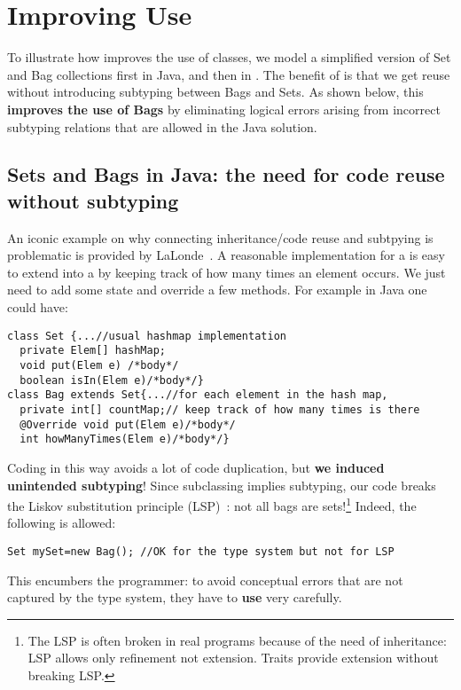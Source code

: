 \saveSpace
\section{Improving Use}
\saveSpace
To illustrate how 
\name improves the use of classes, we model a simplified version of
Set and Bag collections first in Java, and then in \name.
The benefit of \name is that we get reuse 
without introducing subtyping between Bags and Sets.
As shown below, this \textbf{improves the 
use of Bags} by eliminating logical errors arising from incorrect
subtyping relations that are allowed in the Java solution. 
\saveSpace
\subsection{Sets and Bags in Java: the need for code reuse without 
subtyping}
\saveSpace
An iconic example on why connecting inheritance/code reuse and
subtpying is problematic is provided by
LaLonde~\cite{LaLonde:1991:SSS:110673.110679}.  A reasonable
implementation for a \Q@Set@ is easy to extend into a \Q@Bag@ by
keeping track of how many times an element occurs.  We just need to
add some state and override a few methods.
For example in Java one could have:
\saveSpace\saveSpace
\begin{lstlisting}
class Set {...//usual hashmap implementation
  private Elem[] hashMap;
  void put(Elem e) /*body*/
  boolean isIn(Elem e)/*body*/}
class Bag extends Set{...//for each element in the hash map,
  private int[] countMap;// keep track of how many times is there
  @Override void put(Elem e)/*body*/
  int howManyTimes(Elem e)/*body*/}
\end{lstlisting}
\saveSpace\saveSpace\saveSpace
\noindent Coding \Q@Bag@ in this way avoids a lot of code
duplication, but \textbf{we induced unintended subtyping}! 
Since subclassing implies subtyping, our code breaks the Liskov substitution principle (LSP)~\cite{martin2000design}: not all bags are sets!\footnote{The LSP is often broken in real programs because of the need of inheritance: LSP allows only refinement not extension. Traits provide extension without breaking LSP.}
Indeed, the following is allowed:
\saveSpace\saveSpace
\begin{lstlisting}
Set mySet=new Bag(); //OK for the type system but not for LSP
\end{lstlisting}
\saveSpace\saveSpace
This encumbers the programmer:
to avoid conceptual errors that are not captured by the type system, 
they have to \textbf{use} \Q@Bag@ very carefully.


